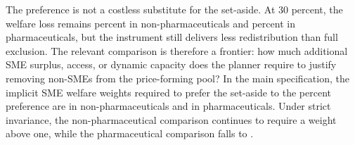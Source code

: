 \documentclass[12pt]{article}
\begin{document}
The preference is not a costless substitute for the set-aside. At 30 percent,
the welfare loss remains \welfPrefThirtyNp{} percent in non-pharmaceuticals and
\welfPrefThirtyPh{} percent in pharmaceuticals, but the instrument still
delivers less redistribution than full exclusion. The relevant comparison is
therefore a frontier: how much additional SME surplus, access, or dynamic
capacity does the planner require to justify removing non-SMEs from the
price-forming pool? In the main specification, the implicit SME welfare weights
required to prefer the set-aside to the \prefMainPct{} percent preference are
\welfWeightMainNp{} in non-pharmaceuticals and \welfWeightMainPh{} in
pharmaceuticals. Under strict invariance, the non-pharmaceutical comparison
continues to require a weight above one, while the pharmaceutical comparison
falls to \welfWeightSiPh.
\end{document}
